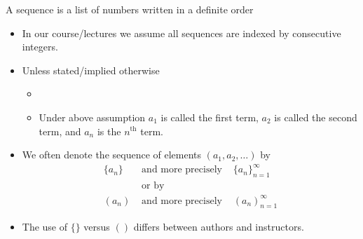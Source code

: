 \begin{frame}
\begin{definition}
A sequence is a list of numbers  written in a definite order

\end{definition}
\begin{itemize}
\item<2-> In our course/lectures we assume all sequences are indexed by consecutive integers.
\item<3-> {Unless stated/implied otherwise }
\begin{itemize}
\item<3-> 
\item<4-> Under above assumption $a_1$ is called the first term, $a_2$ is called the second term, and $a_n$ is the $n^{\text{th}}$ term.
\end{itemize}
\item<5-> We often denote the sequence of elements $\left(a_1, a_2, \dots\right)$ by 
\[
\begin{array}{lcl}
\{ a_n\} &\textrm{ and more precisely }& \{ a_n\}_{n = 1}^\infty\\
&\text{ or by }&\\
\left(a_n\right) &\textrm{ and more precisely }& \left( a_n\right)_{n = 1}^\infty
\end{array}
\]
\item<6-> The use of $\{\}$ versus $()$ differs between authors and instructors.
 

 
\end{itemize}

\vskip 5cm
	
\end{frame}

